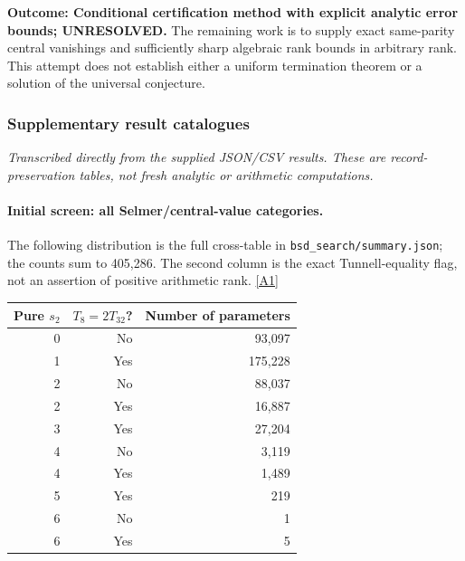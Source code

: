 \documentclass[11pt]{article}
\newcommand{\srcref}[1]{\hyperlink{source:#1}{[#1]}}
\begin{document}
\textbf{Outcome: Conditional certification method with explicit analytic
error bounds; UNRESOLVED.} The remaining work is to supply exact
same-parity central vanishings and sufficiently sharp algebraic rank
bounds in arbitrary rank. This attempt does not establish either a
uniform termination theorem or a solution of the universal conjecture.


\subsubsection{Supplementary result catalogues}\label{catalogues}
\textit{Transcribed directly from the supplied JSON/CSV results. These are record-preservation tables, not fresh analytic or arithmetic computations.}

\paragraph{Initial screen: all Selmer/central-value categories.}
The following distribution is the full cross-table in
\nolinkurl{bsd_search/summary.json}; the counts sum to 405,286. The second column
is the exact Tunnell-equality flag, not an assertion of positive arithmetic rank.
\srcref{A1}
\begin{center}
\begin{tabular}{rrr}
\toprule
Pure $s_2$ & $T_8=2T_{32}$? & Number of parameters\\
\midrule
0 & No & 93,097\\
1 & Yes & 175,228\\
2 & No & 88,037\\
2 & Yes & 16,887\\
3 & Yes & 27,204\\
4 & No & 3,119\\
4 & Yes & 1,489\\
5 & Yes & 219\\
6 & No & 1\\
6 & Yes & 5\\
\bottomrule
\end{tabular}
\end{center}
\end{document}
